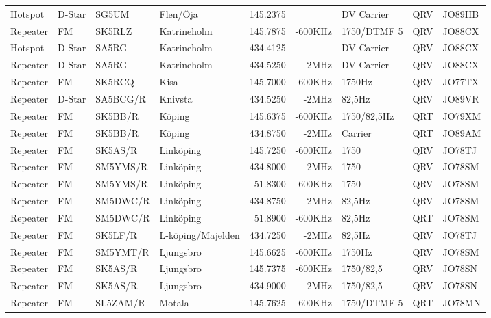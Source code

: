 \begin{longtable}{llllrrlcl}
Hotspot  & D-Star & SG5UM    & Flen/Öja          & 145.2375 &         & DV Carrier    & QRV  & JO89HB \\
Repeater & FM     & SK5RLZ   & Katrineholm       & 145.7875 & -600KHz & 1750/DTMF 5   & QRV  & JO88CX \\
Hotspot  & D-Star & SA5RG    & Katrineholm       & 434.4125 &         & DV Carrier    & QRV  & JO88CX \\
Repeater & D-Star & SA5RG    & Katrineholm       & 434.5250 & -2MHz   & DV Carrier    & QRV  & JO88CX \\
Repeater & FM     & SK5RCQ   & Kisa              & 145.7000 & -600KHz & 1750Hz        & QRV  & JO77TX \\
Repeater & D-Star & SA5BCG/R & Knivsta           & 434.5250 & -2MHz   & 82,5Hz        & QRV  & JO89VR \\
Repeater & FM     & SK5BB/R  & Köping            & 145.6375 & -600KHz & 1750/82,5Hz   & QRT  & JO79XM \\
Repeater & FM     & SK5BB/R  & Köping            & 434.8750 & -2MHz   & Carrier       & QRT  & JO89AM \\
Repeater & FM     & SK5AS/R  & Linköping         & 145.7250 & -600KHz & 1750          & QRV  & JO78TJ \\
Repeater & FM     & SM5YMS/R & Linköping         & 434.8000 & -2MHz   & 1750          & QRV  & JO78SM \\
Repeater & FM     & SM5YMS/R & Linköping         & 51.8300  & -600KHz & 1750          & QRV  & JO78SM \\
Repeater & FM     & SM5DWC/R & Linköping         & 434.8750 & -2MHz   & 82,5Hz        & QRV  & JO78SM \\
Repeater & FM     & SM5DWC/R & Linköping         & 51.8900  & -600KHz & 82,5Hz        & QRT  & JO78SM \\
Repeater & FM     & SK5LF/R  & L-köping/Majelden & 434.7250 & -2MHz   & 82,5Hz        & QRV  & JO78TJ \\
Repeater & FM     & SM5YMT/R & Ljungsbro         & 145.6625 & -600KHz & 1750Hz        & QRV  & JO78SM \\
Repeater & FM     & SK5AS/R  & Ljungsbro         & 145.7375 & -600KHz & 1750/82,5     & QRV  & JO78SN \\
Repeater & FM     & SK5AS/R  & Ljungsbro         & 434.9000 & -2MHz   & 1750/82,5     & QRV  & JO78SN \\
Repeater & FM     & SL5ZAM/R & Motala            & 145.7625 & -600KHz & 1750/DTMF 5   & QRT  & JO78MN \\

\end{longtable}
